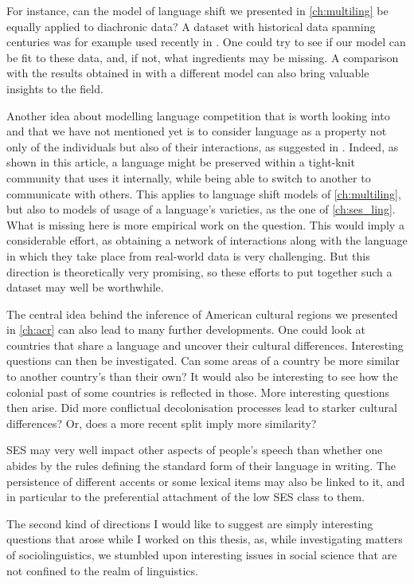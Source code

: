 \documentclass[../thesis.tex]{subfiles}
\begin{document}
For instance, can the model of language shift we presented in \cref{ch:multiling} be
equally applied to diachronic data? A dataset with historical data spanning centuries
was for example used recently in \cite{SeoaneAreDutch2022}. One could try to see if our
model can be fit to these data, and, if not, what ingredients may be missing. A
comparison with the results obtained in \cite{SeoaneAreDutch2022} with a different model
can also bring valuable insights to the field. 

Another idea about modelling language competition that is worth looking into and that we
have not mentioned yet is to consider language as a property not only of the individuals
but also of their interactions, as suggested in \cite{CarroCoupledDynamics2016}. Indeed,
as shown in this article, a language might be preserved within a tight-knit community
that uses it internally, while being able to switch to another to communicate with
others. This applies to language shift models of \cref{ch:multiling}, but also to models
of usage of a language's varieties, as the one of \cref{ch:ses_ling}. What is missing
here is more empirical work on the question. This would imply a considerable effort, as
obtaining a network of interactions along with the language in which they take place
from real-world data is very challenging. But this direction is theoretically very
promising, so these efforts to put together such a dataset may well be worthwhile.

The central idea behind the inference of American cultural regions we presented in
\cref{ch:acr} can also lead to many further developments. One could look at countries
that share a language and uncover their cultural differences. Interesting questions can
then be investigated. Can some areas of a country be more similar to another country's
than their own? It would also be interesting to see how the colonial past of some
countries is reflected in those. More interesting questions then arise. Did more
conflictual decolonisation processes lead to starker cultural differences? Or, does a
more recent split imply more similarity?

\Ac{SES} may very well impact other aspects of people's speech than whether one abides
by the rules defining the standard form of their language in writing. The persistence of
different accents or some lexical items may also be linked to it, and in particular to
the preferential attachment of the low \ac{SES} class to them. 

The second kind of directions I would like to suggest are simply interesting questions
that arose while I worked on this thesis, as, while investigating matters of
sociolinguistics, we stumbled upon interesting issues in social science that are not
confined to the realm of linguistics.
\end{document}

